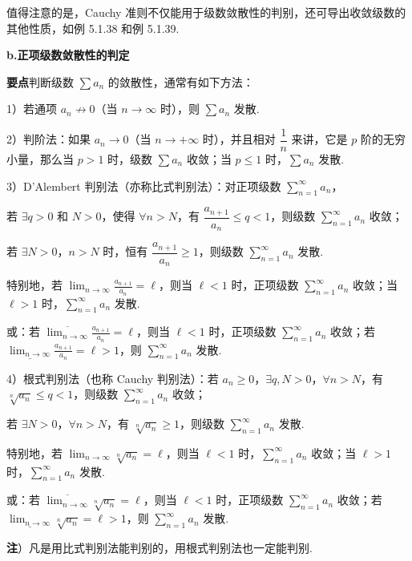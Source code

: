 \documentclass[UTF8,12pt,a4paper,fontset=fandol]{ctexart}
\begin{document}
值得注意的是，Cauchy 准则不仅能用于级数敛散性的判别，还可导出收敛级数的其他性质，如例 5.1.38 和例 5.1.39.

\noindent\textbf{b.\quad 正项级数敛散性的判定}

\noindent\textbf{要点}\quad 判断级数 $\sum a_n$ 的敛散性，通常有如下方法：

1）若通项 $a_n\not\to0$（当 $n\to\infty$ 时），则 $\sum a_n$ 发散.

2）判阶法：如果 $a_n\to0$（当 $n\to+\infty$ 时），并且相对 $\dfrac1n$ 来讲，它是 $p$ 阶的无穷小量，那么当 $p>1$ 时，级数 $\sum a_n$ 收敛；当 $p\le1$ 时，$\sum a_n$ 发散.

3）D'Alembert 判别法（亦称比式判别法）：对正项级数 $\displaystyle\sum_{n=1}^\infty a_n$，

若 $\exists q>0$ 和 $N>0$，使得 $\forall n>N$，有 $\dfrac{a_{n+1}}{a_n}\le q<1$，则级数 $\displaystyle\sum_{n=1}^\infty a_n$ 收敛；

若 $\exists N>0$，$n>N$ 时，恒有 $\dfrac{a_{n+1}}{a_n}\ge1$，则级数 $\displaystyle\sum_{n=1}^\infty a_n$ 发散.

特别地，若 $\displaystyle\lim_{n\to\infty}\frac{a_{n+1}}{a_n}=\ell$，则当 $\ell<1$ 时，正项级数 $\displaystyle\sum_{n=1}^\infty a_n$ 收敛；当 $\ell>1$ 时，$\displaystyle\sum_{n=1}^\infty a_n$ 发散.

或：若 $\displaystyle\overline{\lim_{n\to\infty}}\frac{a_{n+1}}{a_n}=\ell$，则当 $\ell<1$ 时，正项级数 $\displaystyle\sum_{n=1}^\infty a_n$ 收敛；若 $\displaystyle\underline{\lim_{n\to\infty}}\frac{a_{n+1}}{a_n}=\ell>1$，则 $\displaystyle\sum_{n=1}^\infty a_n$ 发散.

4）根式判别法（也称 Cauchy 判别法）：若 $a_n\ge0$，$\exists q,N>0$，$\forall n>N$，有 $\sqrt[n]{a_n}\le q<1$，则级数 $\displaystyle\sum_{n=1}^\infty a_n$ 收敛；

若 $\exists N>0$，$\forall n>N$，有 $\sqrt[n]{a_n}\ge1$，则级数 $\displaystyle\sum_{n=1}^\infty a_n$ 发散.

特别地，若 $\displaystyle\lim_{n\to\infty}\sqrt[n]{a_n}=\ell$，则当 $\ell<1$ 时，$\displaystyle\sum_{n=1}^\infty a_n$ 收敛；当 $\ell>1$ 时，$\displaystyle\sum_{n=1}^\infty a_n$ 发散.

或：若 $\displaystyle\overline{\lim_{n\to\infty}}\sqrt[n]{a_n}=\ell$，则当 $\ell<1$ 时，正项级数 $\displaystyle\sum_{n=1}^\infty a_n$ 收敛；若 $\displaystyle\underline{\lim_{n\to\infty}}\sqrt[n]{a_n}=\ell>1$，则 $\displaystyle\sum_{n=1}^\infty a_n$ 发散.

\noindent\textbf{注}）凡是用比式判别法能判别的，用根式判别法也一定能判别.
\end{document}
